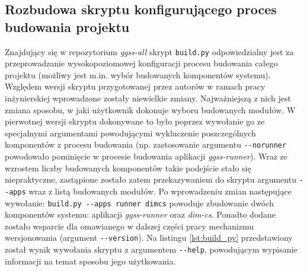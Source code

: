 \subsection{Rozbudowa skryptu konfigurującego proces budowania projektu}
Znajdujący się w repozytorium \emph{ggss-all} skrypt \lstinline{build.py} odpowiedzialny jest za przeprowadzanie wysokopoziomowej konfiguracji procesu budowania całego projektu (możliwy jest m.in. wybór budowanych komponentów systemu). Względem wersji skryptu przygotowanej przez autorów w ramach pracy inżynierskiej wprowadzone zostały niewielkie zmiany. Najważniejszą z nich jest zmiana sposobu, w jaki użytkownik dokonuje wyboru budowanych modułów. W pierwotnej wersji skryptu dokonywane to było poprzez wywołanie go ze specjalnymi argumentami powodującymi wykluczenie poszczególnych komponentów z procesu budowania (np. zastosowanie argumentu \lstinline{--norunner} powodowało pominięcie w procesie budowania aplikacji \emph{ggss-runner}). Wraz ze wzrostem liczby budowanych komponentów takie podejście stało się niepraktyczne, zastąpione zostało zatem przekazywaniem do skryptu argumentu \lstinline{--apps} wraz z listą budowanych modułów. Po wprowadzeniu zmian następujące wywołanie: \lstinline{build.py --apps runner dimcs} powoduje zbudowanie dwóch komponentów systemu: aplikacji \emph{ggss-runner} oraz \emph{dim-cs}. Ponadto dodane zostało wsparcie dla omawianego w dalszej części pracy mechanizmu wersjonowania (argument \lstinline{--version}). Na listingu \ref{lst:build_py} przedstawiony został wynik wywołania skryptu z argumentem \lstinline{--help}, powodującym wypisanie informacji na temat sposobu jego użytkowania.

